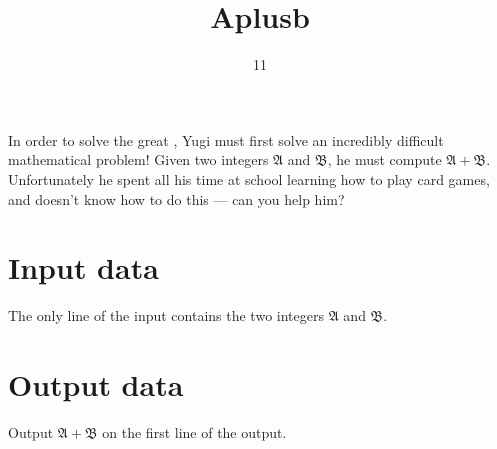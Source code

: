 \documentclass[en]{problem}
\title{Aplusb}
\date{11}{2}{2022}
\begin{document}
\maketitle

In order to solve the great , Yugi must first solve an incredibly difficult mathematical problem! Given two integers $\mathfrak{A}$ and $\mathfrak{B}$, he must compute $\mathfrak{A} + \mathfrak{B}$. Unfortunately he spent all his time at school learning how to play card games, and doesn't know how to do this --- can you help him?

\section{Input data}

The only line of the input contains the two integers $\mathfrak{A}$ and $\mathfrak{B}$.

\section{Output data}

Output $\mathfrak{A} + \mathfrak{B}$ on the first line of the output.

\begin{restrictions}
\end{restrictions}

\begin{examples}
%
%
\end{examples}
\end{document}
